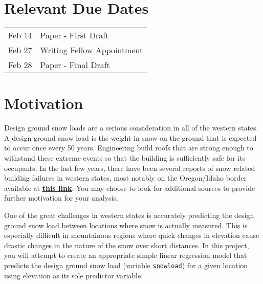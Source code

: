 \documentclass[12pt]{notes}
\begin{document}

\section*{Relevant Due Dates}

\begin{center}
\renewcommand{\arraystretch}{1.5}
\begin{tabular}{|l|l|}
\hline
Feb 14 & Paper - First Draft \\
Feb 27 & Writing Fellow Appointment \\
Feb 28 & Paper - Final Draft \\ 
\hline
\end{tabular}
\end{center}

\section*{Motivation}

Design ground snow loads are a serious consideration in all of the western states. A design ground snow load is the weight in snow on the ground that is expected to occur once every 50 years. Engineering build roofs that are strong enough to withstand these extreme events so that the building is sufficiently safe for its occupants. In the last few years, there have been several reports of snow related building failures in western states, most notably on the Oregon/Idaho border available at  \href{https://www.washingtonpost.com/news/morning-mix/wp/2017/01/26/a-lot-of-scared-people-relentless-snow-collapses-hundreds-of-roofs-in-idaho-devastates-rural-county/}{\underline{\textbf{this link}}}. You may choose to look for additional sources to provide further motivation for your analysis. 

One of the great challenges in western states is accurately predicting the design ground snow load between locations where snow is actually measured. This is especially difficult in mountainous regions where quick changes in elevation cause drastic changes in the nature of the snow over short distances. In this project, you will attempt to create an appropriate simple linear regression model that predicts the design ground snow load (variable \texttt{snowload}) for a given location using elevation as its sole predictor variable. 
\end{document}
